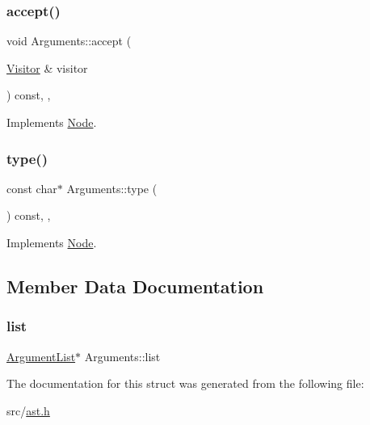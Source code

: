 \subsubsection{\texorpdfstring{accept()}{accept()}}
{\footnotesize\ttfamily void Arguments\+::accept (\begin{DoxyParamCaption}\item[{\hyperlink{struct_visitor}{Visitor} \&}]{visitor }\end{DoxyParamCaption}) const\hspace{0.3cm}{\ttfamily [inline]}, {\ttfamily [override]}, {\ttfamily [virtual]}}



Implements \hyperlink{struct_node_a10bd7af968140bbf5fa461298a969c71}{Node}.

\mbox{\label{struct_arguments_ace630c05708ff98216542b3b495b07d4}} 
\subsubsection{\texorpdfstring{type()}{type()}}
{\footnotesize\ttfamily const char$\ast$ Arguments\+::type (\begin{DoxyParamCaption}{ }\end{DoxyParamCaption}) const\hspace{0.3cm}{\ttfamily [inline]}, {\ttfamily [override]}, {\ttfamily [virtual]}}



Implements \hyperlink{struct_node_a82f29420d0a38efcc370352528e94e9b}{Node}.



\subsection{Member Data Documentation}
\mbox{\label{struct_arguments_a05f7d1acffd6f78b6aa33f62dd7984af}} 
\subsubsection{\texorpdfstring{list}{list}}
{\footnotesize\ttfamily \hyperlink{struct_argument_list}{Argument\+List}$\ast$ Arguments\+::list}



The documentation for this struct was generated from the following file\+:\begin{DoxyCompactItemize}
\item 
src/\hyperlink{ast_8h}{ast.\+h}\end{DoxyCompactItemize}
